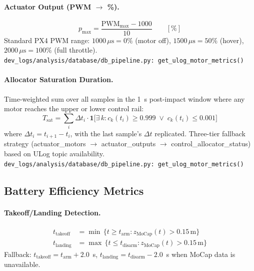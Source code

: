 \medskip
\paragraph{Actuator Output (PWM $\to$ \%).}
\begin{equation}
    p_{\max} = \frac{\mathrm{PWM}_{\max} - 1000}{10}\qquad [\%]
\end{equation}
Standard PX4 PWM range: $1000\,\mu\text{s} = 0\%$ (motor off), $1500\,\mu\text{s} = 50\%$ (hover), $2000\,\mu\text{s} = 100\%$ (full throttle).\\
\texttt{\small dev\_logs/analysis/database/db\_pipeline.py:\ get\_ulog\_motor\_metrics()}

\medskip
\paragraph{Allocator Saturation Duration.}
Time-weighted sum over all samples in the 1~s post-impact window where any motor reaches the upper or lower control rail:
\begin{equation}
    T_{\text{sat}} = \sum_{i} \Delta t_i \cdot \mathbf{1}\bigl[\exists\, k : c_k(t_i) \ge 0.999 \;\lor\; c_k(t_i) \le 0.001\bigr]
\end{equation}
where $\Delta t_i = t_{i+1} - t_i$, with the last sample's $\Delta t$ replicated. Three-tier fallback strategy (actuator\_motors $\to$ actuator\_outputs $\to$ control\_allocator\_status) based on ULog topic availability.\\
\texttt{\small dev\_logs/analysis/database/db\_pipeline.py:\ get\_ulog\_motor\_metrics()}

\subsection{Battery Efficiency Metrics}

\paragraph{Takeoff/Landing Detection.}
\begin{align}
    t_{\text{takeoff}} &= \min\, \{ t \ge t_{\text{arm}} : z_{\text{MoCap}}(t) > 0.15\,\mathrm{m} \} \\
    t_{\text{landing}}  &= \max\, \{ t \le t_{\text{disarm}} : z_{\text{MoCap}}(t) > 0.15\,\mathrm{m} \}
\end{align}
Fallback: $t_{\text{takeoff}} = t_{\text{arm}} + 2.0$~s, $t_{\text{landing}} = t_{\text{disarm}} - 2.0$~s when MoCap data is unavailable.

